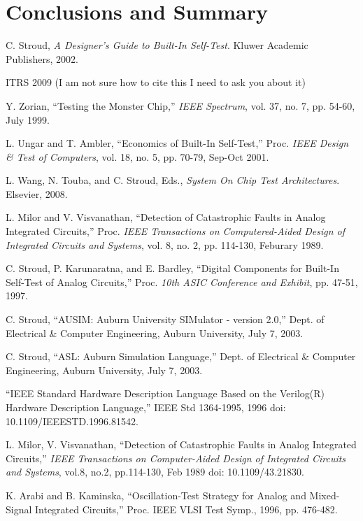\documentclass[12pt]{report}
\begin{document}
\chapter{Conclusions and Summary}

\begin{thebibliography}{99}
 C. Stroud, \textit{A Designer's Guide to Built-In Self-Test}. Kluwer Academic Publishers, 2002.

 ITRS 2009 (I am not sure how to cite this I need to ask you about it)

 Y. Zorian, ``Testing the Monster Chip,'' \textit{IEEE Spectrum}, vol. 37, no. 7, pp. 54-60, July 1999.

 L. Ungar and T. Ambler, ``Economics of Built-In Self-Test,'' Proc. \textit{IEEE Design \& Test of Computers}, vol. 18, no. 5, pp. 70-79, Sep-Oct 2001. 

 L. Wang, N. Touba, and C. Stroud, Eds., \textit{System On Chip Test Architectures}. Elsevier, 2008.

 L. Milor and V. Visvanathan, ``Detection of Catastrophic Faults in Analog Integrated Circuits,'' Proc. \textit{IEEE Transactions on Computered-Aided Design of Integrated Circuits and Systems}, vol. 8, no. 2, pp. 114-130, Feburary 1989.

 C. Stroud, P. Karunaratna, and E. Bardley, ``Digital Components for Built-In Self-Test of Analog Circuits,'' Proc. \textit{10th ASIC Conference and Exhibit}, pp. 47-51, 1997.

 C. Stroud, ``AUSIM: Auburn University SIMulator - version 2.0,'' Dept. of Electrical \& 
Computer Engineering, Auburn University, July 7, 2003.

 C. Stroud, ``ASL: Auburn Simulation Language,'' Dept. of Electrical \& Computer
Engineering, Auburn University, July 7, 2003.

 ``IEEE Standard Hardware Description Language Based on the Verilog(R) Hardware Description Language,'' IEEE Std 1364-1995, 1996 doi: 10.1109/IEEESTD.1996.81542.

 L. Milor, V. Visvanathan, ``Detection of Catastrophic Faults in Analog Integrated Circuits,'' \textit{IEEE Transactions on Computer-Aided Design of Integrated Circuits and Systems}, vol.8, no.2, pp.114-130, Feb 1989 doi: 10.1109/43.21830.

 K. Arabi and B. Kaminska, ``Oscillation-Test Strategy for Analog and Mixed-Signal Integrated Circuits,'' Proc. IEEE VLSI Test Symp.,  1996, pp. 476-482.


\end{thebibliography}
\end{document}
